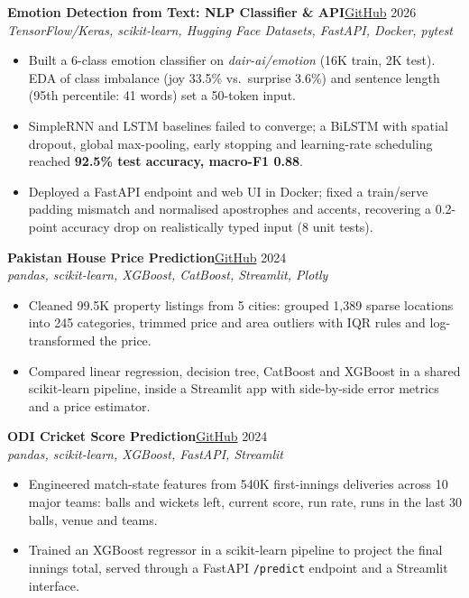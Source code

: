 \documentclass[10pt,a4paper]{article}
\newcommand{\project}[3]{%
  \par\addvspace{5pt}\needspace{6\baselineskip}\textbf{#1}\hfill{\small #2}\\[-1pt]
  {\small\itshape\color{muted} #3}\par}
\begin{document}
\project{Emotion Detection from Text: NLP Classifier \& API}
  {\href{https://github.com/Shah-123/Emotion_detection}{GitHub} \textbar{} 2026}
  {TensorFlow/Keras, scikit-learn, Hugging Face Datasets, FastAPI, Docker, pytest}
\begin{itemize}
  \item Built a 6-class emotion classifier on \textit{dair-ai/emotion} (16K train, 2K test). EDA of
        class imbalance (joy 33.5\% vs.\ surprise 3.6\%) and sentence length (95th percentile:
        41 words) set a 50-token input.
  \item SimpleRNN and LSTM baselines failed to converge; a BiLSTM with spatial dropout, global
        max-pooling, early stopping and learning-rate scheduling reached \textbf{92.5\% test accuracy,
        macro-F1 0.88}.
  \item Deployed a FastAPI endpoint and web UI in Docker; fixed a train/serve padding mismatch and
        normalised apostrophes and accents, recovering a 0.2-point accuracy drop on realistically
        typed input (8 unit tests).
\end{itemize}

\project{Pakistan House Price Prediction}
  {\href{https://github.com/Shah-123/datascience/tree/main/Houses_price_prediction}{GitHub} \textbar{} 2024}
  {pandas, scikit-learn, XGBoost, CatBoost, Streamlit, Plotly}
\begin{itemize}
  \item Cleaned 99.5K property listings from 5 cities: grouped 1,389 sparse locations into 245
        categories, trimmed price and area outliers with IQR rules and log-transformed the price.
  \item Compared linear regression, decision tree, CatBoost and XGBoost in a shared scikit-learn
        pipeline, inside a Streamlit app with side-by-side error metrics and a price estimator.
\end{itemize}

\project{ODI Cricket Score Prediction}
  {\href{https://github.com/Shah-123/datascience/tree/main/Cricket_APP}{GitHub} \textbar{} 2024}
  {pandas, scikit-learn, XGBoost, FastAPI, Streamlit}
\begin{itemize}
  \item Engineered match-state features from 540K first-innings deliveries across 10 major teams:
        balls and wickets left, current score, run rate, runs in the last 30 balls, venue and teams.
  \item Trained an XGBoost regressor in a scikit-learn pipeline to project the final innings total,
        served through a FastAPI \texttt{/predict} endpoint and a Streamlit interface.
\end{itemize}
\end{document}
